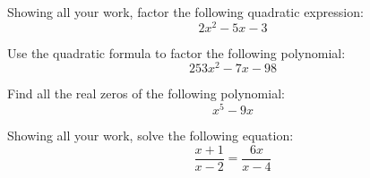 \documentclass[11pt,letterpaper]{article}
\begin{document}

 Showing all your work, factor the following quadratic expression:
	\[
	2x^2 - 5x - 3
	\]



\newpage



 Use the quadratic formula to factor the following polynomial:
	\[
	253x^2 - 7x - 98
	\]



\newpage



 Find all the real zeros of the following polynomial:
	\[
	x^5 - 9x
	\]



\newpage



 Showing all your work, solve the following equation:
	\[
	\dfrac{x + 1}{x - 2}= \dfrac{6x}{x - 4}
	\]
\end{document}
